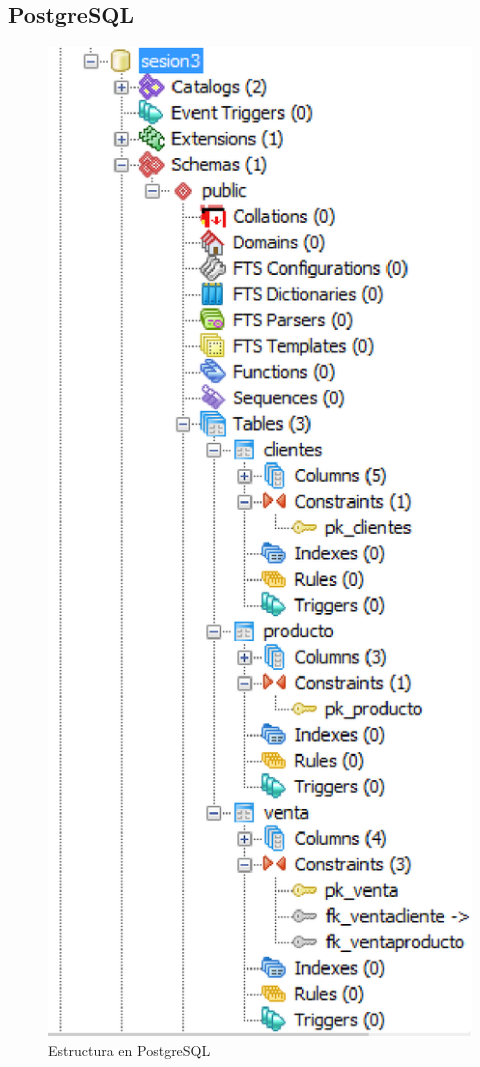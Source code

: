 \documentclass[a4paper,12pt]{article}
\begin{document}
\subsection{PostgreSQL}

\begin{figure}[h]
\centering
\includegraphics[scale=0.42]{2.eps}
\caption{Estructura en PostgreSQL}
\end{figure}
\end{document}
